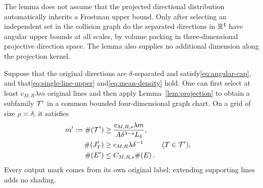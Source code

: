 \begin{remark}
The lemma does not assume that the projected directional distribution automatically inherits a Frostman upper bound.
Only after selecting an independent set in the collision graph do the separated directions in $\mathbb R^4$
have angular upper bounds at all scales, by volume packing in three-dimensional projective direction space.
The lemma also supplies no additional dimension along the projection kernel.
\end{remark}

\begin{lemma}\label{lem:marks}
Suppose that the original directions are $\delta$-separated and satisfy\eqref{eq:angular-cap},
and that\eqref{eq:single-line-upper} and\eqref{eq:mean-density} hold.
One can first select at least $c_{M,R}\lambda m$ original lines and then apply Lemma~\ref{lem:projection}
to obtain a subfamily $\mathcal T'$ in a common bounded four-dimensional graph chart.
On a grid of size $\rho\asymp\delta$, it satisfies
\begin{align}
 m':=\#\!\left(\mathcal T'\right)&\ge
 \frac{c_{M,R,s}\lambda m}{A\delta^{3-s}L_\delta},\label{eq:heavy-output-count}\\
 \#\!\left(J'_T\right)&\ge c_{M,R}\lambda\delta^{-1}
       &&(T\in\mathcal T'),\label{eq:individual-output-marks}\\
 \#\!\left(E'\right)&\le C_{M,R,s}\#\!\left(E\right).\label{eq:output-union}
\end{align}
Every output mark comes from its own original label; extending supporting lines adds no shading.
\end{lemma}

